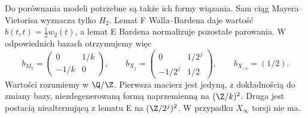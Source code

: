 Do porównania modeli potrzebne są także
ich formy wiązania. Sam ciąg
Mayera--Vietorisa wyznacza tylko $H_2$.
Lemat F Walla--Bardena daje wartość
$b(t,t)=\tfrac12w_2(t)$, a lemat E
Bardena normalizuje pozostałe
parowania. W odpowiednich bazach
otrzymujemy więc
\[
 b_{M_k}=\begin{pmatrix}
 0&1/k\\-1/k&0
 \end{pmatrix},\qquad
 b_{X_j}=\begin{pmatrix}
 0&1/2^j\\-1/2^j&1/2
 \end{pmatrix},\qquad
 b_{X_{-1}}=(1/2).
\]
Wartości rozumiemy w $\Q/\Z$.
Pierwsza macierz jest jedyną, z dokładnością
do zmiany bazy, niezdegenerowaną formą
naprzemienną na $(\Z/k)^2$.
Druga jest postacią niealternującą
z lematu E na $(\Z/2^j)^2$.
W przypadku $X_\infty$ torsji nie ma.

